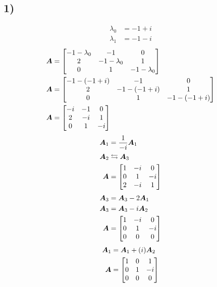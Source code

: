 \documentclass{article}
\begin{document}
\subsection{1)}
\begin{align*}
	\lambda_0 & = -1 + i \\
	\lambda_1 & = -1 - i
\end{align*}
\begin{align*}
	\bm{A} & = \begin{bmatrix}
		-1 - \lambda_0 & -1 & 0 \\
		2 & -1 - \lambda_0 & 1 \\
		0 & 1 & -1 - \lambda_0
	\end{bmatrix} \\
	\bm{A} & = \begin{bmatrix}
		-1 - (-1 + i) & -1 & 0 \\
		2 & -1 - (-1 + i) & 1 \\
		0 & 1 & -1 - (-1 + i)
	\end{bmatrix} \\
	\bm{A} & = \begin{bmatrix}
		-i & -1 & 0 \\
		2 & -i & 1 \\
		0 & 1 & -i
	\end{bmatrix}
\end{align*}
\begin{align*}
	\bm{A}_1 & = \frac{1}{-i}\bm{A}_1 \\
	\bm{A}_2 & \leftrightarrows \bm{A}_3 \\
	\bm{A} & = \begin{bmatrix}
		1 & -i & 0 \\
		0 & 1 & -i \\
		2 & -i & 1
	\end{bmatrix}
\end{align*}
\begin{align*}
	\bm{A}_3 & = \bm{A}_3 - 2\bm{A}_1 \\
	\bm{A}_3 & = \bm{A}_3 - i\bm{A}_2 \\
	\bm{A} & = \begin{bmatrix}
		1 & -i & 0 \\
		0 & 1 & -i \\
		0 & 0 & 0
	\end{bmatrix}
\end{align*}
\begin{align*}
	\bm{A}_1 & = \bm{A}_1 + (i)\bm{A}_2 \\
	\bm{A} & = \begin{bmatrix}
		1 & 0 & 1 \\
		0 & 1 & -i \\
		0 & 0 & 0
	\end{bmatrix}
\end{align*}
\end{document}
